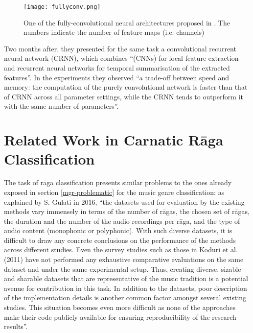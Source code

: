 \begin{figure}[h]
  \centering
  \texttt{[image: fullyconv.png]}
  \caption{One of the fully-convolutional neural architectures proposed in \cite{choi-fcn}. The numbers indicate the number of feature maps (i.e. channels)}
  \label{fig:wav-to-mfcc}
\end{figure}


Two months after, they presented for the same task a convolutional recurrent neural network (CRNN)\cite{choi-crnn}, which combines ``(CNNs) for local feature extraction and recurrent neural networks for temporal summarisation of the extracted features''. In the experiments they observed ``a trade-off between speed and memory: the computation of the purely convolutional network is faster than that of CRNN across all parameter settings, while the CRNN tends to outperform it with the same number of parameters''.









\section{Related Work in Carnatic R\=aga Classification} \label{context_raaga}

The task of r\=aga classification presents similar problems to the ones already exposed in section \ref{mgr-problematic} for the music genre classification: as explained by S. Gulati in 2016, ``the datasets used for evaluation by the existing methods vary immensely in terms of the number of r\=agas, the chosen set of r\=agas, the duration and the number of the audio recordings per r\=aga, and the type of audio content (monophonic or polyphonic). With such diverse datasets, it is difficult to draw any concrete conclusions on the performance of the methods across different studies. Even the survey studies such as those in Koduri et al. (2011) have not performed any exhaustive comparative evaluations on the same dataset and under the same experimental setup. Thus, creating diverse, sizable and sharable datasets that are representative of the music tradition is a potential avenue for contribution in this task. In addition to the datasets, poor description of the implementation details is another common factor amongst several existing studies. This situation becomes even more difficult as none of the approaches make their code publicly available for ensuring reproducibility of the research results''\cite[p.44]{gulati}.\\


